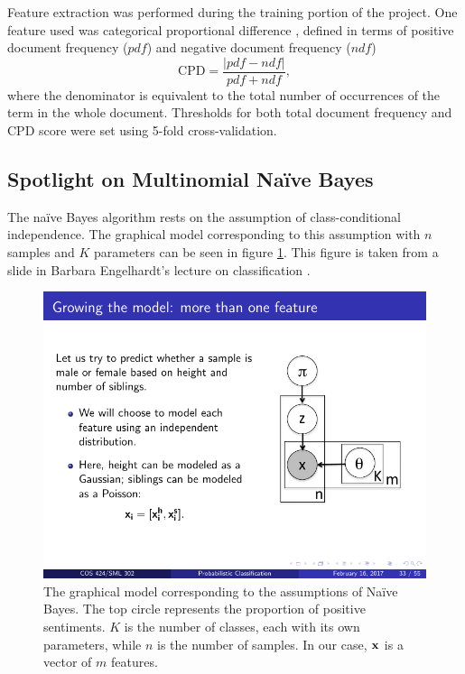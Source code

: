 \documentclass{article} %
\begin{document}
	Feature extraction was performed during the training portion of the project. One feature used was categorical proportional difference \cite{oKeefe2009}, defined in terms of positive document frequency ($pdf$) and negative document frequency ($ndf$)
	\begin{equation}
	\mbox{CPD} = \frac{|pdf - ndf|}{pdf + ndf},
	\end{equation}
	where the denominator is equivalent to the total number of occurrences of the term in the whole document. Thresholds for both total document frequency and CPD score were set using 5-fold cross-validation.
	
	\subsection{Spotlight on Multinomial Na\"ive Bayes}
	
	The na\"ive Bayes algorithm rests on the assumption of class-conditional independence. The graphical model corresponding to this assumption with $n$ samples and $K$ parameters can be seen in figure \ref{fig:dag}. This figure is taken from a slide in Barbara Engelhardt's lecture on classification \cite{engelhardt17}.
	
	\begin{figure}[h]
		\centering
		\includegraphics[scale=1]{DAG}
		\caption{The graphical model corresponding to the assumptions of Na\"ive Bayes. The top circle represents the proportion of positive sentiments. $K$ is the number of classes, each with its own parameters, while $n$ is the number of samples. In our case, $\bf x$ is a vector of $m$ features.}
		\label{fig:dag}
	\end{figure}
	
\end{document}
